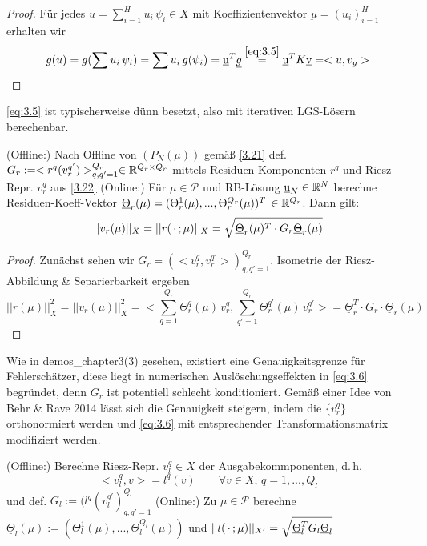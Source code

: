 \begin{proof}
	Für jedes $u = \sum_{i=1}^H u_i \, \psi_i \in X$ mit Koeffizientenvektor $\underbar u = (u_i)_{i=1}^H$ erhalten wir
	\[
		g(u) = g(\sum u_i \, \psi_i) = \sum u_i \, g(\psi_i) = \underbar u^T \underline{g} \overset{\ref{eq:3.5}}{=} \underbar u^T K \underbar v = <u,v_g>
	\] 
\end{proof}

\begin{bem}
	\ref{eq:3.5} ist typischerweise dünn besetzt, also mit iterativen LGS-Lösern berechenbar.
\end{bem}

\begin{kor}
\label{3.24}
	(Offline:) Nach Offline von $(P_N(\mu))$ gemäß \ref{3.21} def. $G_r := <r^q (v_r^{q'})>_{q,q' =1}^{Q_r} \in \mathbb{R}^{Q_r \times Q_r}$ mittels Residuen-Komponenten $r^q$ und Riesz-Repr. $v_r^q$ aus \ref{3.22}
	(Online:) Für $\mu \in \mathcal{P}$ und RB-Lösung $\underbar u_N \in \mathbb{R}^N$ berechne Residuen-Koeff-Vektor $\underline{\Theta}_r(\mu) = (\Theta_r^1(\mu),...,\Theta_r^{Q_r} (\mu))^T \, \in \mathbb{R}^{Q_r}$.
	Dann gilt: 
	\begin{align}
	||v_r(\mu)||_X = ||r(\,\cdot\,;\mu)||_X = \sqrt{\underline{\Theta}_r(\mu)^T \cdot G_r \underline{\Theta}_r(\mu)}
	\label{eq:3.6}
	\end{align}
\end{kor}

\begin{proof}
	Zunächst sehen wir $G_r = (<v_r^q,v_r^{q'}>)_{q, q' = 1}^{Q_r}$. Isometrie der Riesz-Abbildung \& Separierbarkeit ergeben
	\[
		||r(\mu)||_X^2 = ||v_r(\mu)||_X^2 = <\sum_{q=1}^{Q_r} \Theta_r^q(\mu) \, v_r^q,\sum_{q'=1}^{Q_r} \Theta_r^{q'}(\mu) \, v_r^{q'}>= \underline{\Theta}_r^T \cdot G_r \cdot \underline{\Theta}_r (\mu) 
	\]
\end{proof}

\begin{bem}
	Wie in \textsf{demos\_chapter3(3)} gesehen, existiert eine Genauigkeitsgrenze für Fehlerschätzer, diese liegt in numerischen Auslöschungseffekten in \ref{eq:3.6} begründet, denn $G_r$ ist potentiell schlecht konditioniert. Gemäß einer Idee von Behr \& Rave 2014 lässt sich die Genauigkeit steigern, indem die $\{v_r^q\}$ orthonormiert werden und \ref{eq:3.6} mit entsprechender Transformationsmatrix modifiziert werden.
\end{bem}

\begin{kor}
	(Offline:) Berechne Riesz-Repr. $v_l^q \in X$ der Ausgabekommponenten, d.\,h.
	\[
		<v_l^q,v> = l^q(v) \qquad \forall v \in X, \, q=1,...,Q_l
	\]
	und def. $G_l := (l^q(v_l^{q'})_{q, q' =1}^{Q_l}$
	(Online:) Zu $\mu \in \mathcal{P}$ berechne $\underline{\Theta}_l (\mu) := (\Theta_l^1(\mu),...,\Theta_l^{Q_l}(\mu))$ und $||l(\,\cdot\,;\mu)||_{X'} = \sqrt{\underline{\Theta}_l^T G_l \underline{\Theta}_l}$
\end{kor}

